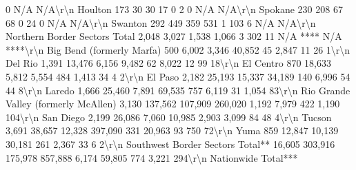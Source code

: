 \documentclass[
  12pt,
]{book}
\newenvironment{Shaded}{\begin{snugshade}}{\end{snugshade}}
\begin{document}
\begin{Shaded}
\begin{Highlighting}[]
 0           N/A     N/A\textbackslash{}r\textbackslash{}n Houlton                                           173                 30                       30                      17                0                2               0           N/A     N/A\textbackslash{}r\textbackslash{}n Spokane                                           230                208                       67                      68                0               24               0           N/A     N/A\textbackslash{}r\textbackslash{}n Swanton                                           292                449                      359                     531                1              103               6           N/A     N/A\textbackslash{}r\textbackslash{}n Northern Border Sectors Total                    2,048              3,027                    1,538                   1,066               3              302              11        N/A **** N/A ****\textbackslash{}r\textbackslash{}n Big Bend (formerly Marfa)                         500               6,002                   3,346                   40,852              45             2,847             11            26      1\textbackslash{}r\textbackslash{}n Del Rio                                          1,391             13,476                    6,156                   9,482              62             8,022             12            99     18\textbackslash{}r\textbackslash{}n El Centro                                         870              18,633                    5,812                   5,554             484             1,413             34             4      2\textbackslash{}r\textbackslash{}n El Paso                                          2,182             25,193                   15,337                  34,189             140             6,996             54            44      8\textbackslash{}r\textbackslash{}n Laredo                                           1,666             25,460                    7,891                  69,535             757             6,119             31          1,054    83\textbackslash{}r\textbackslash{}n Rio Grande Valley (formerly McAllen)             3,130            137,562                  107,909                260,020             1,192            7,979            422          1,190   104\textbackslash{}r\textbackslash{}n San Diego                                        2,199             26,086                    7,060                  10,985            2,903            3,099             84            48      4\textbackslash{}r\textbackslash{}n Tucson                                           3,691             38,657                   12,328                397,090              331            20,963             93           750     72\textbackslash{}r\textbackslash{}n Yuma                                              859              12,847                   10,139                  30,181             261             2,367             33             6      2\textbackslash{}r\textbackslash{}n Southwest Border Sectors Total**                16,605            303,916                  175,978                857,888             6,174           59,805            774          3,221   294\textbackslash{}r\textbackslash{}n Nationwide Total***                             
\end{Highlighting}
\end{Shaded}
\end{document}
